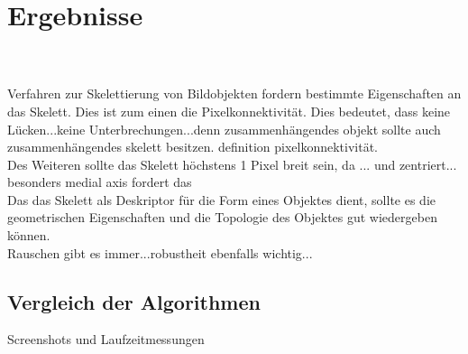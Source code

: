 \chapter{Ergebnisse}
\\\\
Verfahren zur Skelettierung von Bildobjekten fordern bestimmte Eigenschaften an das Skelett. Dies ist zum einen die Pixelkonnektivität. Dies bedeutet, dass keine Lücken...keine Unterbrechungen...denn zusammenhängendes objekt sollte auch zusammenhängendes skelett besitzen. definition pixelkonnektivität.\\
Des Weiteren sollte das Skelett höchstens 1 Pixel breit sein, da ... und zentriert... besonders medial axis fordert das\\
Das das Skelett als Deskriptor für die Form eines Objektes dient, sollte es die geometrischen Eigenschaften und die Topologie des Objektes gut wiedergeben können. \\
Rauschen gibt es immer...robustheit ebenfalls wichtig...
\section{Vergleich der Algorithmen}
Screenshots und Laufzeitmessungen
